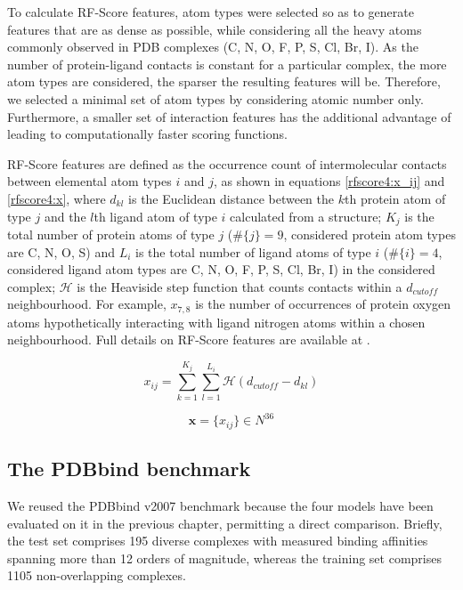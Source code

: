 \documentclass[twocolumn]{bmcart}
\begin{document}
To calculate RF-Score features, atom types were selected so as to generate features that are as dense as possible, while considering all the heavy atoms commonly observed in PDB complexes (C, N, O, F, P, S, Cl, Br, I). As the number of protein-ligand contacts is constant for a particular complex, the more atom types are considered, the sparser the resulting features will be. Therefore, we selected a minimal set of atom types by considering atomic number only. Furthermore, a smaller set of interaction features has the additional advantage of leading to computationally faster scoring functions.

RF-Score features are defined as the occurrence count of intermolecular contacts between elemental atom types $i$ and $j$, as shown in equations \ref{rfscore4:x_ij} and \ref{rfscore4:x}, where $d_{kl}$ is the Euclidean distance between the $k$th protein atom of type $j$ and the $l$th ligand atom of type $i$ calculated from a structure; $K_j$ is the total number of protein atoms of type $j$ ($\#\{j\}=9$, considered protein atom types are C, N, O, S) and $L_i$ is the total number of ligand atoms of type $i$ ($\#\{i\}=4$, considered ligand atom types are C, N, O, F, P, S, Cl, Br, I) in the considered complex; $\mathcal{H}$ is the Heaviside step function that counts contacts within a $d_{cutoff}$ neighbourhood. For example, $x_{7,8}$ is the number of occurrences of protein oxygen atoms hypothetically interacting with ligand nitrogen atoms within a chosen neighbourhood. Full details on RF-Score features are available at \cite{564,1295}.

\begin{equation}
\label{rfscore4:x_ij}
x_{ij}=\sum_{k=1}^{K_j}\sum_{l=1}^{L_i}\mathcal{H}(d_{cutoff}-d_{kl})
\end{equation}

\begin{equation}
\label{rfscore4:x}
\mathbf x=\{x_{ij}\}\in N^{36}
\end{equation}

\subsection*{The PDBbind benchmark}

We reused the PDBbind v2007 benchmark because the four models have been evaluated on it in the previous chapter, permitting a direct comparison. Briefly, the test set comprises 195 diverse complexes with measured binding affinities spanning more than 12 orders of magnitude, whereas the training set comprises 1105 non-overlapping complexes.
\end{document}
